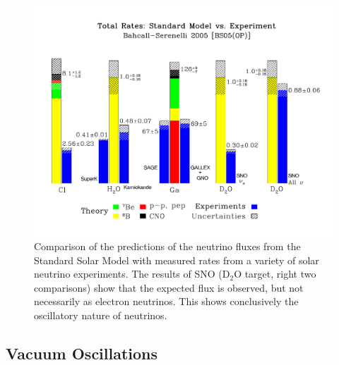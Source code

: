 \begin{figure}
  \centering
  \includegraphics[width=16cm]{SolarNeutrinoFluxes.pdf}
  \caption[Comparison of the predictions of the neutrino fluxes from the Standard Solar Model with measured rates from a variety of solar neutrino experiments.]{Comparison of the predictions of the neutrino fluxes from the Standard Solar Model with measured rates from a variety of solar neutrino experiments.  The results of SNO (D$_2$O target, right two comparisons) show that the expected flux is observed, but not necessarily as electron neutrinos.  This shows conclusively the oscillatory nature of neutrinos.}
  \label{fig:SolarNeutrinoFluxes}
\end{figure}

\subsection{Vacuum Oscillations}\label{sec:VacuumOscillations}

